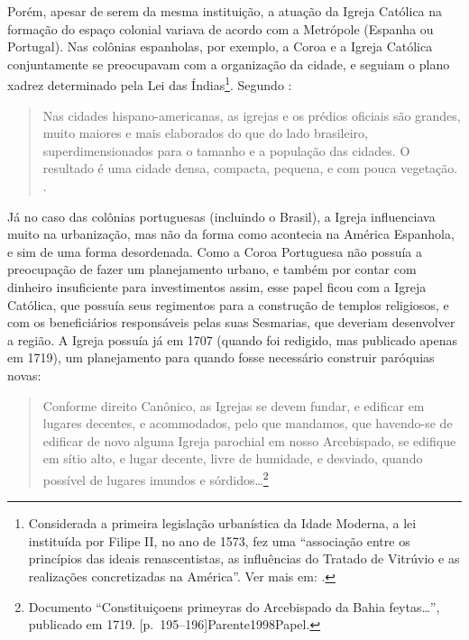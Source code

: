 \begin{refsection}
    Porém, apesar de serem da mesma instituição, a atuação da Igreja Católica na formação do espaço colonial variava de acordo com a Metrópole (Espanha ou Portugal). Nas colônias espanholas, por exemplo, a Coroa e a Igreja Católica conjuntamente se preocupavam com a organização da cidade, e seguiam o plano xadrez determinado pela Lei das Índias\footnote{Considerada a primeira legislação urbanística da Idade Moderna, a lei instituída por Filipe II, no ano de 1573, fez uma ``associação entre os princípios das ideais renascentistas, as influências do Tratado de Vitrúvio e as realizações concretizadas na América''. Ver mais em: .}. Segundo \textcite{Medeiros2010Igreja}:

    \begin{quotation}
        Nas cidades hispano-americanas, as igrejas e os prédios oficiais são grandes, muito maiores e mais elaborados do que do lado brasileiro, superdimensionados para o tamanho e a população das cidades. O resultado é uma cidade densa, compacta, pequena, e com pouca vegetação. \cite[p.~59]{Medeiros2010Igreja}.
    \end{quotation}

    Já no caso das colônias portuguesas (incluindo o Brasil), a Igreja influenciava muito na urbanização, mas não da forma como acontecia na América Espanhola, e sim de uma forma desordenada. Como a Coroa Portuguesa não possuía a preocupação de fazer um planejamento urbano, e também por contar com dinheiro insuficiente para investimentos assim, esse papel ficou com a Igreja Católica, que possuía seus regimentos para a construção de templos religiosos, e com os beneficiários responsáveis pelas suas Sesmarias, que deveriam desenvolver a região. A Igreja possuía já em 1707 (quando foi redigido, mas publicado apenas em 1719), um planejamento para quando fosse necessário construir paróquias novas:

    \begin{quotation}
        Conforme direito Canônico, as Igrejas se devem fundar, e edificar em lugares decentes, e acommodados, pelo que mandamos, que havendo-se de edificar de novo alguma Igreja parochial em nosso Arcebispado, se edifique em sítio alto, e lugar decente, livre de humidade, e desviado, quando possível de lugares imundos e sórdidos\dots\footnote{Documento ``Constituiçoens primeyras do Arcebispado da Bahia feytas\dots'', publicado em 1719. [p.~195--196]{Parente1998Papel}.}
    \end{quotation}


\end{refsection}
